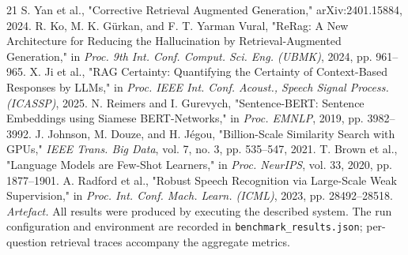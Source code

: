 \documentclass[conference]{IEEEtran}
\begin{document}
\begin{thebibliography}{21}
 S. Yan et al., "Corrective Retrieval Augmented Generation," arXiv:2401.15884, 2024.
 R. Ko, M. K. Gürkan, and F. T. Yarman Vural, "ReRag: A New Architecture for Reducing the Hallucination by Retrieval-Augmented Generation," in \textit{Proc. 9th Int. Conf. Comput. Sci. Eng. (UBMK)}, 2024, pp. 961--965.
 X. Ji et al., "RAG Certainty: Quantifying the Certainty of Context-Based Responses by LLMs," in \textit{Proc. IEEE Int. Conf. Acoust., Speech Signal Process. (ICASSP)}, 2025.
 N. Reimers and I. Gurevych, "Sentence-BERT: Sentence Embeddings using Siamese BERT-Networks," in \textit{Proc. EMNLP}, 2019, pp. 3982--3992.
 J. Johnson, M. Douze, and H. Jégou, "Billion-Scale Similarity Search with GPUs," \textit{IEEE Trans. Big Data}, vol. 7, no. 3, pp. 535--547, 2021.
 T. Brown et al., "Language Models are Few-Shot Learners," in \textit{Proc. NeurIPS}, vol. 33, 2020, pp. 1877--1901.
 A. Radford et al., "Robust Speech Recognition via Large-Scale Weak Supervision," in \textit{Proc. Int. Conf. Mach. Learn. (ICML)}, 2023, pp. 28492--28518.
\textit{Artefact.} All results were produced by executing the described system. The run configuration and environment are recorded in \texttt{benchmark\_results.json}; per-question retrieval traces accompany the aggregate metrics.
\end{thebibliography}
\end{document}
